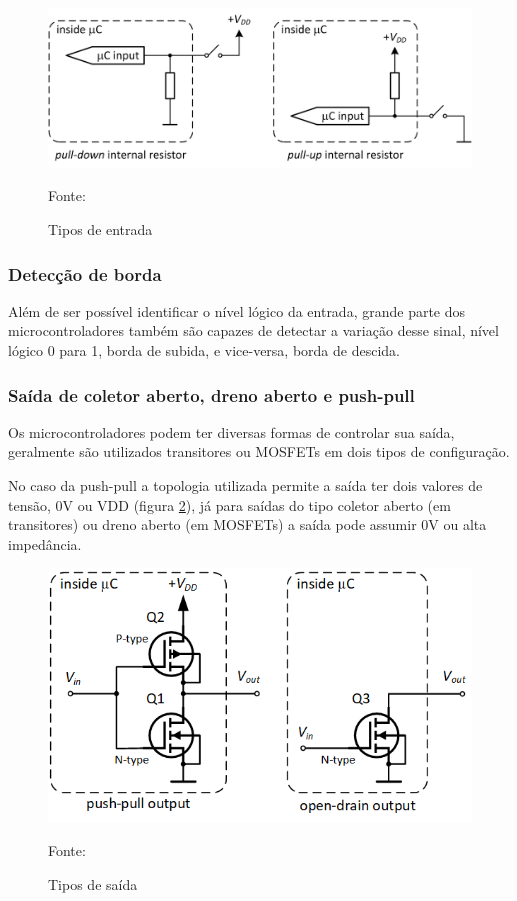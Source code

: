 \begin{figure}[h!]
  \centering
  \includegraphics[width=0.8\linewidth]{figuras/input.png}
  \caption{Tipos de entrada} Fonte: \cite{DigitalIO}
  \label{fig:input}
\end{figure}

\subsubsection*{Detecção de borda}

Além de ser possível identificar o nível lógico da entrada, grande parte dos microcontroladores também são capazes de detectar a variação desse sinal, nível lógico 0 para 1, borda de subida, e vice-versa, borda de descida.

\subsubsection*{Saída de coletor aberto, dreno aberto e push-pull}

Os microcontroladores podem ter diversas formas de controlar sua saída, geralmente são utilizados transitores ou MOSFETs em dois tipos de configuração.

No caso da push-pull a topologia utilizada permite a saída ter dois valores de tensão, 0V ou VDD (figura \ref{fig:output}), já para saídas do tipo coletor aberto (em transitores) ou dreno aberto (em MOSFETs) a saída pode assumir 0V ou alta impedância.

\begin{figure}[h!]
  \centering
  \includegraphics[width=0.7\linewidth]{figuras/output.png}
  \caption{Tipos de saída} Fonte: \cite{DigitalIO}
  \label{fig:output}
\end{figure}

